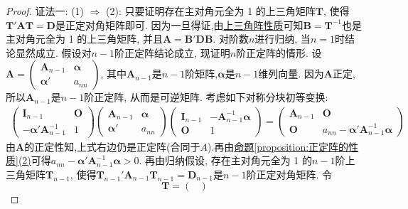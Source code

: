 \documentclass[../../main.tex]{subfiles}%
\begin{document}
\begin{proof}

{\color{blue}证法一:}
(1) $\Rightarrow$ (2): 只要证明存在主对角元全为 1 的上三角矩阵$\boldsymbol{T}$, 使得$\boldsymbol{T}'\boldsymbol{A}\boldsymbol{T}=\boldsymbol{D}$是正定对角矩阵即可. 因为一旦得证,由\hyperref[proposition:上三角阵性质]{上三角阵性质}可知$\boldsymbol{B}=\boldsymbol{T}^{-1}$也是主对角元全为 1 的上三角矩阵, 并且$\boldsymbol{A}=\boldsymbol{B}'\boldsymbol{D}\boldsymbol{B}$. 对阶数$n$进行归纳, 当$n = 1$时结论显然成立. 假设对$n - 1$阶正定阵结论成立, 现证明$n$阶正定阵的情形. 设$\boldsymbol{A}=\begin{pmatrix}
\boldsymbol{A}_{n - 1} & \boldsymbol{\alpha} \\
\boldsymbol{\alpha}' & a_{nn}
\end{pmatrix}$, 其中$\boldsymbol{A}_{n - 1}$是$n - 1$阶矩阵,$\boldsymbol{\alpha}$是$n - 1$维列向量. 因为$\boldsymbol{A}$正定, 所以$\boldsymbol{A}_{n - 1}$是$n - 1$阶正定阵, 从而是可逆矩阵. 考虑如下对称分块初等变换:
\begin{align*}
\begin{pmatrix}
\boldsymbol{I}_{n - 1} & \boldsymbol{O} \\
-\boldsymbol{\alpha}'\boldsymbol{A}_{n - 1}^{-1} & 1
\end{pmatrix}
\begin{pmatrix}
\boldsymbol{A}_{n - 1} & \boldsymbol{\alpha} \\
\boldsymbol{\alpha}' & a_{nn}
\end{pmatrix}
\begin{pmatrix}
\boldsymbol{I}_{n - 1} & -\boldsymbol{A}_{n - 1}^{-1}\boldsymbol{\alpha} \\
\boldsymbol{O} & 1
\end{pmatrix}
=
\begin{pmatrix}
\boldsymbol{A}_{n - 1} & \boldsymbol{O} \\
\boldsymbol{O} & a_{nn}-\boldsymbol{\alpha}'\boldsymbol{A}_{n - 1}^{-1}\boldsymbol{\alpha}
\end{pmatrix}
\end{align*}
由$\boldsymbol{A}$的正定性知,上式右边仍是正定阵(合同于$A$).再由\hyperref[proposition:正定阵的性质]{命题\ref{proposition:正定阵的性质}(2)}可得$a_{nn}-\boldsymbol{\alpha}'\boldsymbol{A}_{n - 1}^{-1}\boldsymbol{\alpha}>0$. 再由归纳假设, 存在主对角元全为 1 的$n - 1$阶上三角矩阵$\boldsymbol{T}_{n - 1}$, 使得$\boldsymbol{T}_{n - 1}'\boldsymbol{A}_{n - 1}\boldsymbol{T}_{n - 1}=\boldsymbol{D}_{n - 1}$是$n - 1$阶正定对角矩阵. 令
\[
\boldsymbol{T}=\begin{pmatrix}

\end{pmatrix}\]
\end{proof}
\end{document}

